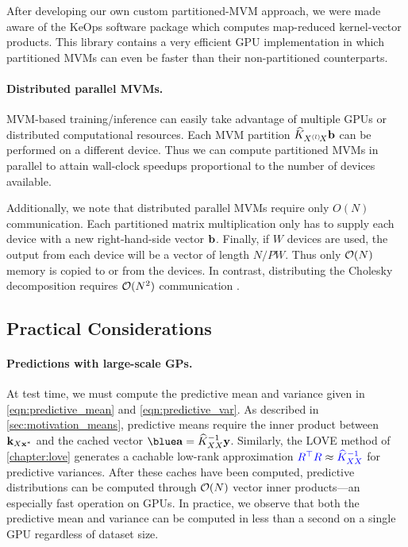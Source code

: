 After developing our own custom partitioned-MVM approach, we were made aware of the KeOps software package \cite{charlier2020kernel} which computes map-reduced kernel-vector products.
This library contains a very efficient GPU implementation in which partitioned MVMs can even be faster than their non-partitioned counterparts.


\paragraph{Distributed parallel MVMs.}
MVM-based training/inference can easily take advantage of multiple GPUs or distributed computational resources.
Each MVM partition $\widehat {K}_{X^{(l)}\!X} \mathbf{b}$ can be performed on a different device.
Thus we can compute partitioned MVMs in parallel to attain wall-clock speedups proportional to the number of devices available.

Additionally, we note that distributed parallel MVMs require only $O(N)$ communication.
Each partitioned matrix multiplication only has to supply each device with a new right-hand-side vector $\mathbf{b}$.
Finally, if $W$ devices are used, the output from each device will be a vector of length $N / PW$.
Thus only $\bigo{N}$ memory is copied to or from the devices.
In contrast, distributing the Cholesky decomposition requires $\bigo{N^2}$ communication \citep{nguyen2019exact}.





\subsection{Practical Considerations}

\paragraph{Predictions with large-scale GPs.}
At test time, we must compute the predictive mean and variance given in \cref{eqn:predictive_mean} and \cref{eqn:predictive_var}.
As described in \cref{sec:motivation_means}, predictive means require the inner product between $\mathbf{k}_{X \mathbf{x}^*}$ and the cached vector $\blue \ba = \trainK^{-1} \by$.
Similarly, the LOVE method of \cref{chapter:love} generates a cachable low-rank approximation ${\color{blue} R^\top R} \approx {\color{blue} \ensuremath{\widehat{K}_{XX}}^{-1}}$ for predictive variances.
After these caches have been computed, predictive distributions can be computed through $\bigo{N}$ vector inner products---an especially fast operation on GPUs.
In practice, we observe that both the predictive mean and variance can be computed in less than a second on a single GPU regardless of dataset size.


